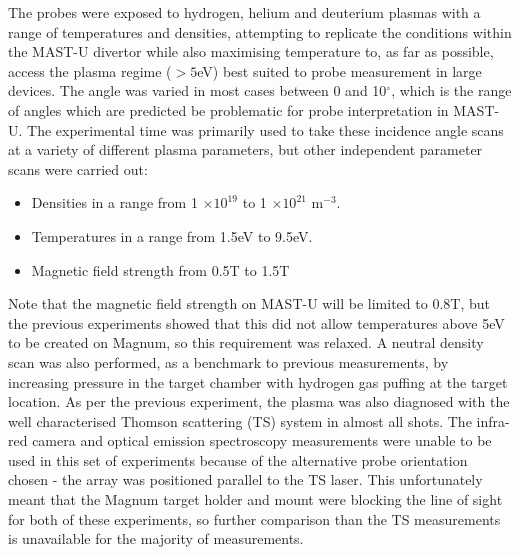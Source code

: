 \documentclass[a4paper, 12pt]{article} %
\begin{document}
	
	 
	The probes were exposed to hydrogen, helium and deuterium plasmas with a range of temperatures and densities, attempting to replicate the conditions within the MAST-U divertor while also maximising temperature to, as far as possible, access the plasma regime ($>5$eV) best suited to probe measurement in large devices.
	The angle was varied in most cases between 0 and 10$^{\circ}$, which is the range of angles which are predicted be problematic for probe interpretation in MAST-U.
	The experimental time was primarily used to take these incidence angle scans at a variety of different plasma parameters, but other independent parameter scans were carried out:
	\begin{itemize}
	    \item Densities in a range from 1 $\times 10^{19}$ to 1 $\times 10^{21}$ m$^{-3}$. 
	    \item Temperatures in a range from 1.5eV to 9.5eV.
	    \item Magnetic field strength from 0.5T to 1.5T
	\end{itemize}
	Note that the magnetic field strength on MAST-U will be limited to 0.8T, but the previous experiments showed that this did not allow temperatures above 5eV to be created on Magnum, so this requirement was relaxed.
	A neutral density scan was also performed, as a benchmark to previous measurements, by increasing pressure in the target chamber with hydrogen gas puffing at the target location.
	As per the previous experiment, the plasma was also diagnosed with the well characterised \cite{} Thomson scattering (TS) system in almost all shots.
	The infra-red camera and optical emission spectroscopy measurements were unable to be used in this set of experiments because of the alternative probe orientation chosen - the array was positioned parallel to the TS laser. 
	This unfortunately meant that the Magnum target holder and mount were blocking the line of sight for both of these experiments, so further comparison than the TS measurements is unavailable for the majority of measurements.
	
\end{document}

